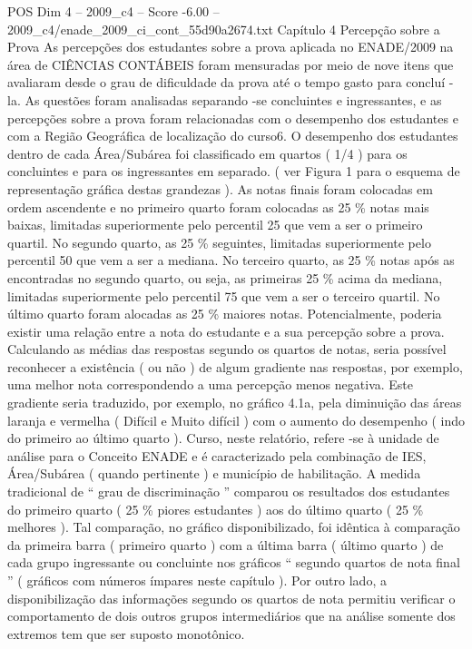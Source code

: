 \begin{textsample}{POS Dim 4 – 2009\_c4 – Score -6.00 – 2009\_c4/enade\_2009\_ci\_cont\_55d90a2674.txt}  \label{ex:f4_pos_335}
Capítulo 4 Percepção sobre a Prova As percepções dos estudantes sobre a prova aplicada no ENADE/2009 na área de CIÊNCIAS CONTÁBEIS foram mensuradas por meio de nove itens que avaliaram desde o grau de dificuldade da prova até o tempo gasto para concluí -la.
As questões foram analisadas separando -se concluintes e ingressantes, e as percepções sobre a prova foram relacionadas com o desempenho dos estudantes e com a Região Geográfica de localização do curso6.
O desempenho dos estudantes dentro de cada Área/Subárea foi classificado em quartos ( 1/4 ) para os concluintes e para os ingressantes em separado. ( ver Figura 1 para o esquema de representação gráfica destas grandezas ).
As notas finais foram colocadas em ordem ascendente e no primeiro quarto foram colocadas as 25 \% notas mais baixas, limitadas superiormente pelo percentil 25 que vem a ser o primeiro quartil.
No segundo quarto, as 25 \% seguintes, limitadas superiormente pelo percentil 50 que vem a ser a mediana.
No terceiro quarto, as 25 \% notas após as encontradas no segundo quarto, ou seja, as primeiras 25 \% acima da mediana, limitadas superiormente pelo percentil 75 que vem a ser o terceiro quartil.
No último quarto foram alocadas as 25 \% maiores notas.
Potencialmente, poderia existir uma relação entre a nota do estudante e a sua percepção sobre a prova.
Calculando as médias das respostas segundo os quartos de notas, seria possível reconhecer a existência ( ou não ) de algum gradiente nas respostas, por exemplo, uma melhor nota correspondendo a uma percepção menos negativa.
Este gradiente seria traduzido, por exemplo, no gráfico 4.1a, pela diminuição das áreas laranja e vermelha ( Difícil e Muito difícil ) com o aumento do desempenho ( indo do primeiro ao último quarto ).
Curso, neste relatório, refere -se à unidade de análise para o Conceito ENADE e é caracterizado pela combinação de IES, Área/Subárea ( quando pertinente ) e município de habilitação.
A medida tradicional de “ grau de discriminação ” comparou os resultados dos estudantes do primeiro quarto ( 25 \% piores estudantes ) aos do último quarto ( 25 \% melhores ).
Tal comparação, no gráfico disponibilizado, foi idêntica à comparação da primeira barra ( primeiro quarto ) com a última barra ( último quarto ) de cada grupo ingressante ou concluinte nos gráficos “ segundo quartos de nota final ” ( gráficos com números ímpares neste capítulo ).
Por outro lado, a disponibilização das informações segundo os quartos de nota permitiu verificar o comportamento de dois outros grupos intermediários que na análise somente dos extremos tem que ser suposto monotônico.

\end{textsample}
